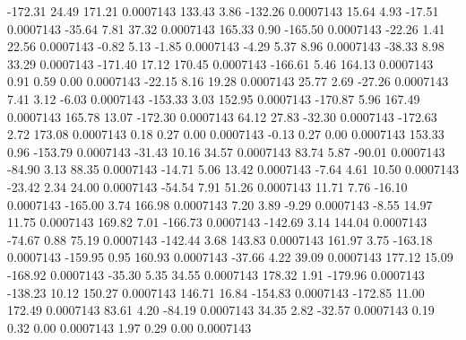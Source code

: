      -172.31       24.49      171.21     0.0007143
      133.43        3.86     -132.26     0.0007143
       15.64        4.93      -17.51     0.0007143
      -35.64        7.81       37.32     0.0007143
      165.33        0.90     -165.50     0.0007143
      -22.26        1.41       22.56     0.0007143
       -0.82        5.13       -1.85     0.0007143
       -4.29        5.37        8.96     0.0007143
      -38.33        8.98       33.29     0.0007143
     -171.40       17.12      170.45     0.0007143
     -166.61        5.46      164.13     0.0007143
        0.91        0.59        0.00     0.0007143
      -22.15        8.16       19.28     0.0007143
       25.77        2.69      -27.26     0.0007143
        7.41        3.12       -6.03     0.0007143
     -153.33        3.03      152.95     0.0007143
     -170.87        5.96      167.49     0.0007143
      165.78       13.07     -172.30     0.0007143
       64.12       27.83      -32.30     0.0007143
     -172.63        2.72      173.08     0.0007143
        0.18        0.27        0.00     0.0007143
       -0.13        0.27        0.00     0.0007143
      153.33        0.96     -153.79     0.0007143
      -31.43       10.16       34.57     0.0007143
       83.74        5.87      -90.01     0.0007143
      -84.90        3.13       88.35     0.0007143
      -14.71        5.06       13.42     0.0007143
       -7.64        4.61       10.50     0.0007143
      -23.42        2.34       24.00     0.0007143
      -54.54        7.91       51.26     0.0007143
       11.71        7.76      -16.10     0.0007143
     -165.00        3.74      166.98     0.0007143
        7.20        3.89       -9.29     0.0007143
       -8.55       14.97       11.75     0.0007143
      169.82        7.01     -166.73     0.0007143
     -142.69        3.14      144.04     0.0007143
      -74.67        0.88       75.19     0.0007143
     -142.44        3.68      143.83     0.0007143
      161.97        3.75     -163.18     0.0007143
     -159.95        0.95      160.93     0.0007143
      -37.66        4.22       39.09     0.0007143
      177.12       15.09     -168.92     0.0007143
      -35.30        5.35       34.55     0.0007143
      178.32        1.91     -179.96     0.0007143
     -138.23       10.12      150.27     0.0007143
      146.71       16.84     -154.83     0.0007143
     -172.85       11.00      172.49     0.0007143
       83.61        4.20      -84.19     0.0007143
       34.35        2.82      -32.57     0.0007143
        0.19        0.32        0.00     0.0007143
        1.97        0.29        0.00     0.0007143
